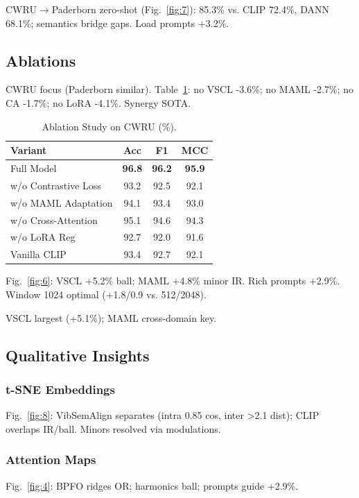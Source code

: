 CWRU$\to$Paderborn zero-shot (Fig.~\ref{fig:7}): 85.3\% vs. CLIP 72.4\%, DANN 68.1\%; semantics bridge gaps. Load prompts +3.2\%.

\subsection{Ablations}

CWRU focus (Paderborn similar). Table~\ref{tab:vi}: no VSCL -3.6\%; no MAML -2.7\%; no CA -1.7\%; no LoRA -4.1\%. Synergy SOTA.

\begin{table}[htbp]
\centering
\caption{Ablation Study on CWRU (\%).}
\label{tab:vi}
\begin{tabular}{@{}lccc@{}}
\toprule
Variant & Acc & F1 & MCC \\
\midrule
Full Model & \textbf{96.8} & \textbf{96.2} & \textbf{95.9} \\
w/o Contrastive Loss & 93.2 & 92.5 & 92.1 \\
w/o MAML Adaptation & 94.1 & 93.4 & 93.0 \\
w/o Cross-Attention & 95.1 & 94.6 & 94.3 \\
w/o LoRA Reg & 92.7 & 92.0 & 91.6 \\
\midrule
Vanilla CLIP & 93.4 & 92.7 & 92.1 \\
\bottomrule
\end{tabular}
\end{table}

Fig.~\ref{fig:6}: VSCL +5.2\% ball; MAML +4.8\% minor IR. Rich prompts +2.9\%. Window 1024 optimal (+1.8/0.9 vs. 512/2048).

VSCL largest (+5.1\%); MAML cross-domain key.

\subsection{Qualitative Insights}

\subsubsection{t-SNE Embeddings}
Fig.~\ref{fig:8}: VibSemAlign separates (intra 0.85 cos, inter >2.1 dist); CLIP overlaps IR/ball. Minors resolved via modulations.

\subsubsection{Attention Maps}
Fig.~\ref{fig:4}: BPFO ridges OR; harmonics ball; prompts guide +2.9\%.

